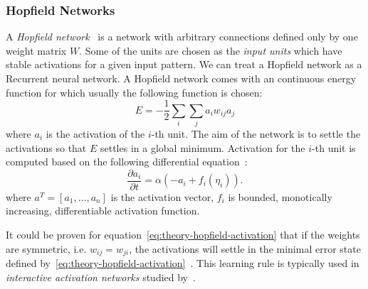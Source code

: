 \subsubsection{Hopfield Networks}
\label{sec:theory-hopfield}

A \emph{Hopfield network}~\citep{hopfield1984neurons} is a network with arbitrary connections defined only by one weight matrix $W$. Some of the units are chosen as the \emph{input units} which have stable activations for a given input pattern. We can treat a Hopfield network as a Recurrent neural network. A Hopfield network comes with an continuous energy function for which usually the following function is chosen: 
\begin{equation}
  \label{eq:theory-hopfield-energy}
  E = -\frac{1}{2}\sum_i\sum_ja_iw_{ij}a_j
\end{equation} 
where $a_i$ is the activation of the $i$-th unit. The aim of the network is to settle the activations so that $E$ settles in a global minimum. Activation for the $i$-th unit is computed based on the following differential equation~\citep{hopfield1984neurons}: 
\begin{equation}
  \label{eq:theory-hopfield-activation}
  \frac{\partial a_i}{\partial t} = \alpha(-a_i + f_i(\eta_i)).
\end{equation} 
where $a^T = [a_1,\ldots,a_n]$ is the activation vector, $f_i$ is bounded, monotically increasing, differentiable activation function.

It could be proven for equation~\ref{eq:theory-hopfield-activation} that if the weights are symmetric, i.e. $w_{ij} = w_{ji}$, the activations will settle in the minimal error state defined by~\ref{eq:theory-hopfield-activation}~\citep{hopfield1984neurons}. This learning rule is typically used in \emph{interactive activation networks} studied by~\citet{grossberg1978theory, mcclelland1981interactive}. 

